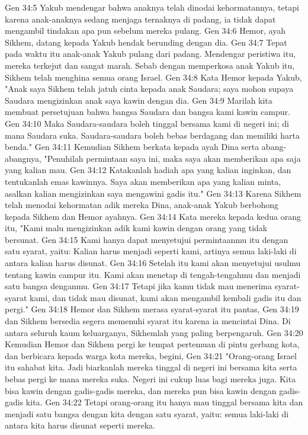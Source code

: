 Gen 34:5  Yakub mendengar bahwa anaknya telah dinodai kehormatannya, tetapi karena anak-anaknya sedang menjaga ternaknya di padang, ia tidak dapat mengambil tindakan apa pun sebelum mereka pulang.
Gen 34:6  Hemor, ayah Sikhem, datang kepada Yakub hendak berunding dengan dia.
Gen 34:7  Tepat pada waktu itu anak-anak Yakub pulang dari padang. Mendengar peristiwa itu, mereka terkejut dan sangat marah. Sebab dengan memperkosa anak Yakub itu, Sikhem telah menghina semua orang Israel.
Gen 34:8  Kata Hemor kepada Yakub, "Anak saya Sikhem telah jatuh cinta kepada anak Saudara; saya mohon supaya Saudara mengizinkan anak saya kawin dengan dia.
Gen 34:9  Marilah kita membuat persetujuan bahwa bangsa Saudara dan bangsa kami kawin campur.
Gen 34:10  Maka Saudara-saudara boleh tinggal bersama kami di negeri ini; di mana Saudara suka. Saudara-saudara boleh bebas berdagang dan memiliki harta benda."
Gen 34:11  Kemudian Sikhem berkata kepada ayah Dina serta abang-abangnya, "Penuhilah permintaan saya ini, maka saya akan memberikan apa saja yang kalian mau.
Gen 34:12  Katakanlah hadiah apa yang kalian inginkan, dan tentukanlah emas kawinnya. Saya akan memberikan apa yang kalian minta, asalkan kalian mengizinkan saya mengawini gadis itu."
Gen 34:13  Karena Sikhem telah menodai kehormatan adik mereka Dina, anak-anak Yakub berbohong kepada Sikhem dan Hemor ayahnya.
Gen 34:14  Kata mereka kepada kedua orang itu, "Kami malu mengizinkan adik kami kawin dengan orang yang tidak bersunat.
Gen 34:15  Kami hanya dapat menyetujui permintaanmu itu dengan satu syarat, yaitu: Kalian harus menjadi seperti kami, artinya semua laki-laki di antara kalian harus disunat.
Gen 34:16  Setelah itu kami akan menyetujui usulmu tentang kawin campur itu. Kami akan menetap di tengah-tengahmu dan menjadi satu bangsa denganmu.
Gen 34:17  Tetapi jika kamu tidak mau menerima syarat-syarat kami, dan tidak mau disunat, kami akan mengambil kembali gadis itu dan pergi."
Gen 34:18  Hemor dan Sikhem merasa syarat-syarat itu pantas,
Gen 34:19  dan Sikhem bersedia segera memenuhi syarat itu karena ia mencintai Dina. Di antara seluruh kaum keluarganya, Sikhemlah yang paling berpengaruh.
Gen 34:20  Kemudian Hemor dan Sikhem pergi ke tempat pertemuan di pintu gerbang kota, dan berbicara kepada warga kota mereka, begini,
Gen 34:21  "Orang-orang Israel itu sahabat kita. Jadi biarkanlah mereka tinggal di negeri ini bersama kita serta bebas pergi ke mana mereka suka. Negeri ini cukup luas bagi mereka juga. Kita bisa kawin dengan gadis-gadis mereka, dan mereka pun bisa kawin dengan gadis-gadis kita.
Gen 34:22  Tetapi orang-orang itu hanya mau tinggal bersama kita dan menjadi satu bangsa dengan kita dengan satu syarat, yaitu: semua laki-laki di antara kita harus disunat seperti mereka.
